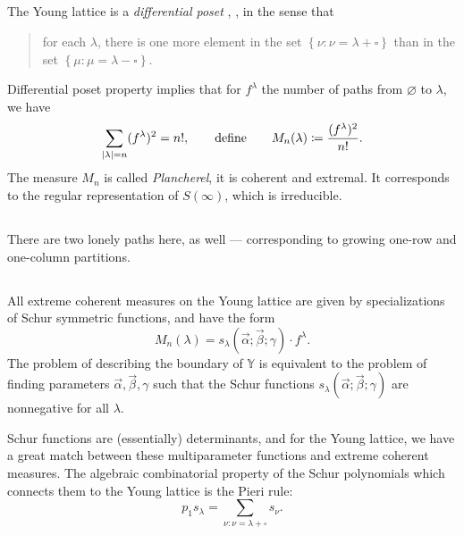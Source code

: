 \documentclass[letterpaper,11pt,oneside,reqno]{article}
\numberwithin{equation}{section}
\theoremstyle{definition}
\begin{document}
\subsection{}
The Young lattice is a \emph{differential poset} \cite{stanley1988differential},
\cite{fomin1994duality},
in the sense that
\begin{quote}
	for each $\lambda$, there is one more element in the set
	$\left\{ \nu\colon\nu=\lambda+\square \right\}$ than
	in the set $\left\{ \mu\colon\mu=\lambda-\square \right\}$.
\end{quote}
Differential poset
property implies that
for $f^\lambda$ the number of paths from $\varnothing$ to $\lambda$, we have
\begin{equation*}
	\sum_{|\lambda|=n}(f^\lambda)^2=n!, \qquad \textnormal{define}\qquad
	M_n(\lambda)\coloneqq\frac{(f^\lambda)^2}{n!}.
\end{equation*}
The measure $M_n$ is called \emph{Plancherel}, it is coherent
and extremal. It corresponds to the regular representation of $S(\infty)$,
which is irreducible.

\subsection{}

There are two lonely paths here, as well --- corresponding to growing
one-row and one-column partitions.

\subsection{}

All extreme coherent measures on the Young lattice are given by specializations
of Schur symmetric functions, and have the form
\begin{equation*}
	M_n(\lambda)=s_\lambda(\vec \alpha;\vec \beta;\gamma)\cdot f^\lambda.
\end{equation*}
The problem of describing the boundary of $\mathbb{Y}$ is equivalent to
the problem of finding parameters $\vec \alpha,\vec \beta,\gamma$ such that
the Schur functions $s_\lambda(\vec \alpha;\vec \beta;\gamma)$ are nonnegative
for all $\lambda$.

Schur functions are (essentially) determinants, and
for the Young lattice, we have a great match between these multiparameter functions and
extreme coherent measures.
The algebraic combinatorial property of the Schur
polynomials which connects them to the Young lattice
is the Pieri rule:
\begin{equation*}
	p_1 s_\lambda=\sum_{\nu\colon \nu=\lambda+\square}s_\nu.
\end{equation*}
\end{document}
